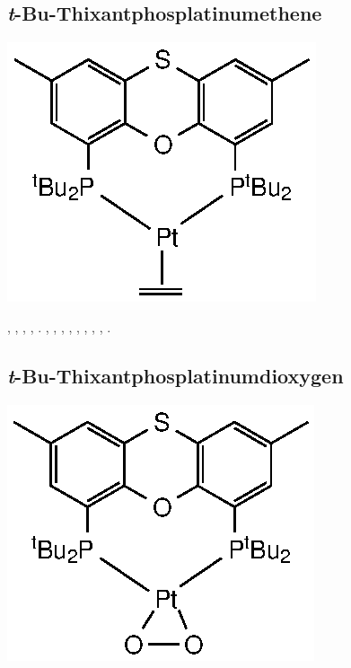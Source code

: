 \subsection*{\emph{t}-Bu-Thixantphosplatinumethene}
\begin{structure}[h]
\begin{center}
\includegraphics{../Structures/StBuPlatinumethene.eps}
\end{center}
\end{structure}

,
,
,
,
.
,
,
,
,
,
,
,
,
.

\subsection*{\emph{t}-Bu-Thixantphosplatinumdioxygen}
\begin{structure}[h]
\begin{center}
\includegraphics{../Structures/StBuPtO2.eps}
\end{center}
\end{structure}

